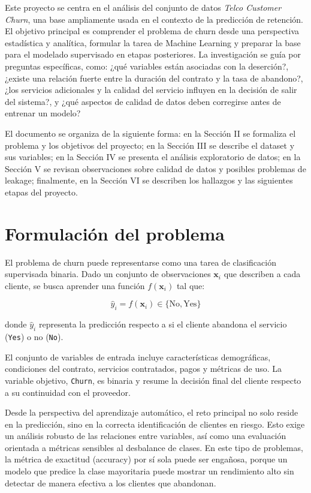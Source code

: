 \documentclass[conference]{IEEEtran}
\begin{document}
Este proyecto se centra en el análisis del conjunto de datos \textit{Telco Customer Churn}, una base ampliamente usada en el contexto de la predicción de retención. El objetivo principal es comprender el problema de churn desde una perspectiva estadística y analítica, formular la tarea de Machine Learning y preparar la base para el modelado supervisado en etapas posteriores. La investigación se guía por preguntas específicas, como: ¿qué variables están asociadas con la deserción?, ¿existe una relación fuerte entre la duración del contrato y la tasa de abandono?, ¿los servicios adicionales y la calidad del servicio influyen en la decisión de salir del sistema?, y ¿qué aspectos de calidad de datos deben corregirse antes de entrenar un modelo?

El documento se organiza de la siguiente forma: en la Sección II se formaliza el problema y los objetivos del proyecto; en la Sección III se describe el dataset y sus variables; en la Sección IV se presenta el análisis exploratorio de datos; en la Sección V se revisan observaciones sobre calidad de datos y posibles problemas de leakage; finalmente, en la Sección VI se describen los hallazgos y las siguientes etapas del proyecto.

\section{Formulación del problema}
El problema de churn puede representarse como una tarea de clasificación supervisada binaria. Dado un conjunto de observaciones $\mathbf{x}_i$ que describen a cada cliente, se busca aprender una función $f(\mathbf{x}_i)$ tal que:

\begin{equation}
\hat{y}_i = f(\mathbf{x}_i) \in \{\text{No}, \text{Yes}\}
\end{equation}

donde $\hat{y}_i$ representa la predicción respecto a si el cliente abandona el servicio (\texttt{Yes}) o no (\texttt{No}).

El conjunto de variables de entrada incluye características demográficas, condiciones del contrato, servicios contratados, pagos y métricas de uso. La variable objetivo, \texttt{Churn}, es binaria y resume la decisión final del cliente respecto a su continuidad con el proveedor.

Desde la perspectiva del aprendizaje automático, el reto principal no solo reside en la predicción, sino en la correcta identificación de clientes en riesgo. Esto exige un análisis robusto de las relaciones entre variables, así como una evaluación orientada a métricas sensibles al desbalance de clases. En este tipo de problemas, la métrica de exactitud (accuracy) por sí sola puede ser engañosa, porque un modelo que predice la clase mayoritaria puede mostrar un rendimiento alto sin detectar de manera efectiva a los clientes que abandonan.
\end{document}
